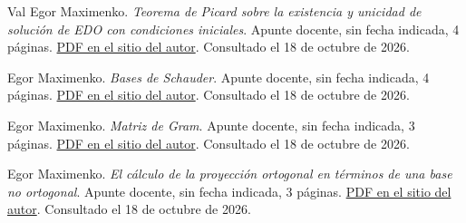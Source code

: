 \begin{thebibliography}{Val}
Egor Maximenko. \emph{Teorema de Picard sobre la existencia y unicidad de solución de EDO con condiciones iniciales}.
Apunte docente, sin fecha indicada, 4 páginas.
\href{https://esfm.egormaximenko.com/numer/Picard_theorem_es.pdf}{PDF en el sitio del autor}.
Consultado el 18 de octubre de 2026.

Egor Maximenko. \emph{Bases de Schauder}.
Apunte docente, sin fecha indicada, 4 páginas.
\href{https://esfm.egormaximenko.com/analysis/Schauder_bases_es.pdf}{PDF en el sitio del autor}.
Consultado el 18 de octubre de 2026.

Egor Maximenko. \emph{Matriz de Gram}.
Apunte docente, sin fecha indicada, 3 páginas.
\href{https://esfm.egormaximenko.com/analysis/Gram_matrix_es.pdf}{PDF en el sitio del autor}.
Consultado el 18 de octubre de 2026.

Egor Maximenko. \emph{El cálculo de la proyección ortogonal en términos de una base no ortogonal}.
Apunte docente, sin fecha indicada, 3 páginas.
\href{https://esfm.egormaximenko.com/analysis/orthogonal_projection_in_terms_of_a_nonorthogonal_basis_es.pdf}{PDF en el sitio del autor}.
Consultado el 18 de octubre de 2026.
\end{thebibliography}
